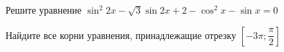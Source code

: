 \begin{ex}
	\begin{condition}
		\begin{enumcols}[label=\asbuk*)]
			\item Решите уравнение \( \sin^2 2x -\sqrt{3}\sin 2x +2-\cos^2 x -\sin x = 0  \)
			\item Найдите все корни уравнения, принадлежащие отрезку \( \left[-3\pi;\dfrac{\pi}{2}\right] \)
		\end{enumcols}
	\end{condition}
\end{ex}